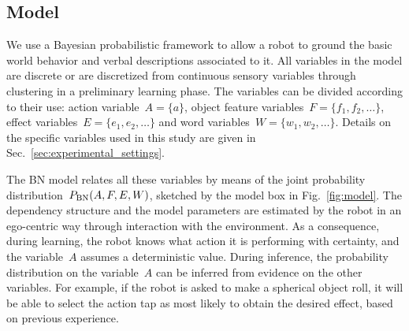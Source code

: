 \subsection{\AffWords{} Model}
\label{sec:bn}
We use a Bayesian probabilistic framework to allow a robot to ground the basic world behavior and verbal descriptions associated to it.
All variables in the model are discrete or are discretized from continuous sensory variables through clustering in a preliminary learning phase.
The variables can be divided according to their use: action variable~$A = \{a\}$, object feature variables~$F=\{f_1, f_2, \dots\}$, effect variables~$E=\{e_1, e_2, \dots\}$ and word variables~$W = \{w_1, w_2, \dots\}$.
Details on the specific variables used in this study are given in Sec.~\ref{sec:experimental_settings}.

The \ac{BN} model relates all these variables by means of the joint probability distribution~$P_{\text{BN}}(A, F, E, W)$, sketched by the \AffWords{} model box in Fig.~\ref{fig:model}.
The dependency structure and the model parameters are estimated by the robot in an ego-centric way through interaction with the environment.
As a consequence, during learning, the robot knows what action it is performing with certainty, and the variable~$A$ assumes a deterministic value.
During inference, the probability distribution on the variable~$A$ can be inferred from evidence on the other variables.
For example, if the robot is asked to make a spherical object roll, it will be able to select the action tap as most likely to obtain the desired effect, based on previous experience.

\newcommand{\myscalefactor}{0.8}

\newcommand{\shapeOfHmmState}{circle} %

\newcommand{\standardhmm}[1]{
    \node[draw,\shapeOfHmmState] (hmm#1s1) {$s_1$};
    \node[draw,\shapeOfHmmState, right of=hmm#1s1] (hmm#1s2) {$s_2$};
    \node[\shapeOfHmmState, right of=hmm#1s2] (hmm#1s3) {\dots};
    \node[draw,\shapeOfHmmState, right of=hmm#1s3] (hmm#1s4) {$s_Q$};
    \node[left of=hmm#1s1]  (invisible1) {};
    \node[right of=hmm#1s4] (invisible2) {};
    \path[->] (hmm#1s1) edge (hmm#1s2);
    \path[loop above] (hmm#1s1) edge (hmm#1s1);
    \path[->] (hmm#1s2) edge (hmm#1s3);
    \path[loop above] (hmm#1s2) edge (hmm#1s2);
    \path[dashed] (hmm#1s2) -- (hmm#1s3);
    \path[->] (hmm#1s3) edge (hmm#1s4);
    \path[loop above] (hmm#1s4) edge (hmm#1s4);
    \path[->] (invisible1) edge (hmm#1s1);
    \path[->] (hmm#1s4) edge (invisible2);
}

